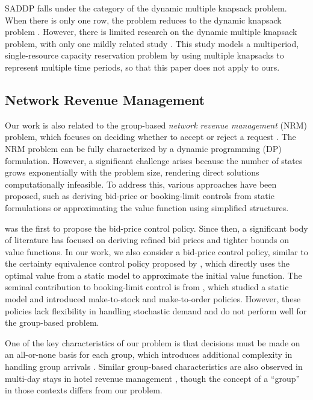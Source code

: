 SADDP falls under the category of the dynamic multiple knapsack problem. When there is only one row, the problem reduces to the dynamic knapsack problem \cite{kleywegt1998dynamic}. However, there is limited research on the dynamic multiple knapsack problem, with only one mildly related study \cite{perry2009approximate}. This study models a multiperiod, single-resource capacity reservation problem by using multiple knapsacks to represent multiple time periods, so that this paper does not apply to ours.


\subsection{Network Revenue Management}
Our work is also related to the group-based \textit{network revenue management} (NRM) problem, which focuses on deciding whether to accept or reject a request \cite{gallego1997multiproduct}. The NRM problem can be fully characterized by a dynamic programming (DP) formulation. However, a significant challenge arises because the number of states grows exponentially with the problem size, rendering direct solutions computationally infeasible. To address this, various approaches have been proposed, such as deriving bid-price or booking-limit controls from static formulations or approximating the value function using simplified structures.

\cite{talluri1998analysis} was the first to propose the bid-price control policy. Since then, a significant body of literature has focused on deriving refined bid prices and tighter bounds on value functions. In our work, we also consider a bid-price control policy, similar to the certainty equivalence control policy proposed by \cite{bertsimas2003revenue}, which directly uses the optimal value from a static model to approximate the initial value function. The seminal contribution to booking-limit control is from \cite{gallego1997multiproduct}, which studied a static model and introduced make-to-stock and make-to-order policies. However, these policies lack flexibility in handling stochastic demand and do not perform well for the group-based problem.


One of the key characteristics of our problem is that decisions must be made on an all-or-none basis for each group, which introduces additional complexity in handling group arrivals \cite{talluri2006theory}. Similar group-based characteristics are also observed in multi-day stays in hotel revenue management \cite{aydin2018decomposition, bitran1995application}, though the concept of a ``group'' in those contexts differs from our problem.


